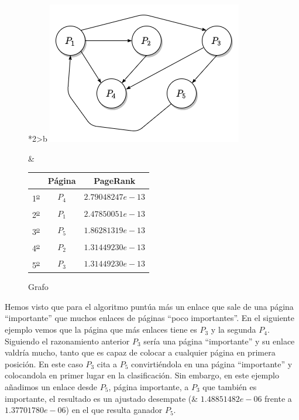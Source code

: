 \documentclass[size=a4, parskip=half, titlepage=false, toc=flat, toc=bib, 12pt]{scrartcl}
\theoremstyle{theorem-style}
\theoremstyle{definition-style}
\theoremstyle{remark-style}
\theoremstyle{example-style}
\theoremstyle{definition-style}
\theoremstyle{remark-style}
\begin{document}
\begin{figure}[!ht]
  \begin{tabular}{*{2}{>{\centering\arraybackslash}b{}}}
  \centering
    \includegraphics[scale=0.5]{./img/grafoej5}
    \caption{Grafo}
    &
      \renewcommand{\arraystretch}{1.3}
      \begin{tabular}{ccc}
        & Página & PageRank         \\ \hline
      1\textsuperscript{\underline{o}}} & $P_4$  & $2.79048247e-13$ \\ \hline
      2\textsuperscript{\underline{o}}} & $P_1$  & $2.47850051e-13$ \\ \hline
      3\textsuperscript{\underline{o}}} & $P_5$  & $1.86281319e-13$ \\ \hline
      4\textsuperscript{\underline{o}}} & $P_2$  & $1.31449230e-13$ \\ \hline
      5\textsuperscript{\underline{o}}} & $P_3$  & $1.31449230e-13$ \\ \hline
      \end{tabular}
    \end{tabular}
\end{figure}

Hemos visto que para el algoritmo puntúa más un enlace que sale de una página ``importante'' que muchos enlaces de páginas ``poco importantes''. En el siguiente ejemplo vemos que la página que más enlaces tiene es $P_3$ y la segunda $P_4$. Siguiendo el razonamiento anterior $P_3$ sería una página ``importante'' y su enlace valdría mucho, tanto que es capaz de colocar a cualquier página en primera posición. En este caso $P_3$ cita a $P_5$ convirtiéndola en una página ``importante'' y colocandola en primer lugar en la clasificación. Sin embargo, en este ejemplo añadimos un enlace desde $P_5$, página importante, a $P_3$ que también es importante, el resultado es un ajustado desempate (& $1.48851482e-06$ frente a $1.37701780e-06$) en el que resulta ganador $P_5$.
\end{document}
